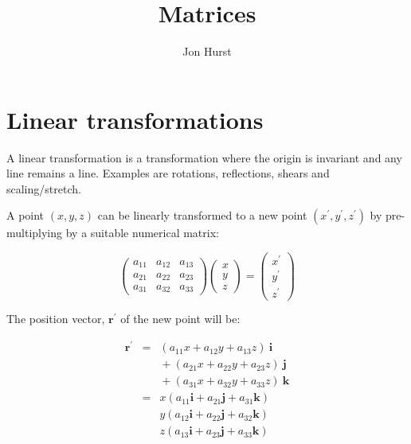 \documentclass[a5paper]{article}
\title{Matrices}
\author{Jon Hurst}
\begin{document}
\maketitle

\section*{Linear transformations}

A linear transformation is a transformation where the origin is invariant and
any line remains a line. Examples are rotations, reflections, shears and
scaling/stretch.

A point $(x,y,z)$ can be linearly transformed to a new point $(x^\prime,
y^\prime, z^\prime)$ by pre-multiplying by a suitable numerical matrix:

\begin{equation}
  \left(
  \begin{array}{ccc}
    a_{11} & a_{12} &a_{13} \\
    a_{21} & a_{22} &a_{23} \\
    a_{31} & a_{32} &a_{33}
  \end{array} \right)
  \left(
  \begin{array}{c}
    x\\ y\\ z
  \end{array} \right) =
  \left(
  \begin{array}{c}
    x^\prime\\ y^\prime\\ z^\prime
  \end{array} \right)
\end{equation}

The position vector, $\bm{r}^\prime$ of the new point will be:

\begin{eqnarray}
  \bm{r}^\prime & = &(a_{11}x + a_{12}y + a_{13}z)\ \bm{i} \\
  & & \mbox{} + (a_{21}x + a_{22}y + a_{23}z)\ \bm{j} \nonumber\\
  & & \mbox{} + (a_{31}x + a_{32}y + a_{33}z)\ \bm{k} \nonumber \\
  & = & x(a_{11}\bm{i} + a_{21}\bm{j} + a_{31}\bm{k}) \nonumber \\
  &  & y(a_{12}\bm{i} + a_{22}\bm{j} + a_{32}\bm{k}) \nonumber \\
  &  & z(a_{13}\bm{i} + a_{23}\bm{j} + a_{33}\bm{k}) \nonumber
\end{eqnarray}
\end{document}
